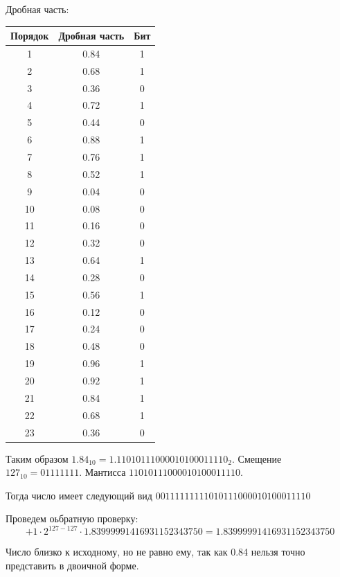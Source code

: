 \documentclass[a4paper, 14pt]{article}
\begin{document}
Дробная часть:
\begin{table}[H]
  \center
  \begin{tabular}{|c|c|c|}
    \hline
    Порядок & Дробная часть & Бит \\ \hline
    1 & 0.84 & 1\\ \hline
    2 & 0.68 & 1\\ \hline
    3 & 0.36 & 0\\ \hline
    4 & 0.72 & 1\\ \hline
    5 & 0.44 & 0\\ \hline
    6 & 0.88 & 1\\ \hline
    7 & 0.76 & 1\\ \hline
    8 & 0.52 & 1\\ \hline
    9 & 0.04 & 0\\ \hline
    10 & 0.08 & 0\\ \hline
    11 & 0.16 & 0\\ \hline
    12 & 0.32 & 0\\ \hline
    13 & 0.64 & 1\\ \hline
    14 & 0.28 & 0\\ \hline
    15 & 0.56 & 1\\ \hline
    16 & 0.12 & 0\\ \hline
    17 & 0.24 & 0\\ \hline
    18 & 0.48 & 0\\ \hline
    19 & 0.96 & 1\\ \hline
    20 & 0.92 & 1\\ \hline
    21 & 0.84 & 1\\ \hline
    22 & 0.68 & 1\\ \hline
    23 & 0.36 & 0\\ \hline
  \end{tabular}
\end{table}

Таким образом $1.84_{10} = 1.11010111000010100011110_2$.
Смещение $127_{10} = 01111111$.
Мантисса $11010111000010100011110$.

Тогда число имеет следующий вид $0 01111111 11010111000010100011110$

Проведем оьбратную проверку:$$ +1 \cdot 2^{127-127} \cdot 1.83999991416931152343750 = 1.83999991416931152343750$$

Число близко к исходному, но не равно ему, так как 0.84 нельзя точно представить в двоичной форме.
\end{document}

